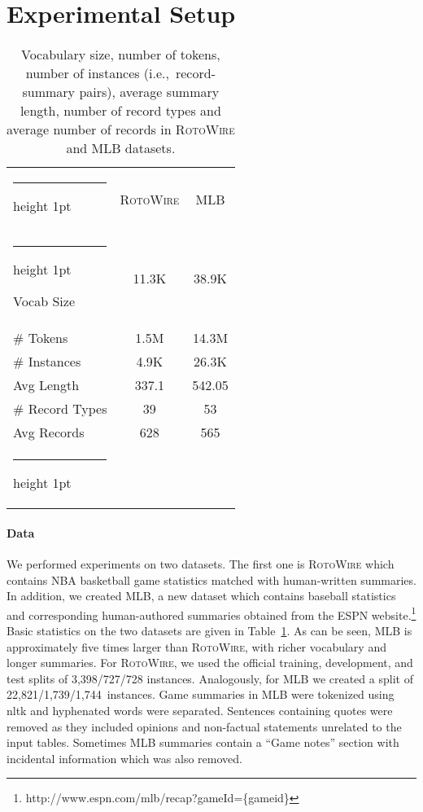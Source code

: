 \documentclass[11pt,a4paper]{article}
\makeatletter
\newcommand{\thickhline}{\noalign {\ifnum 0=`}\fi \hrule height 1pt
    \futurelet \reserved@a \@xhline
}
\makeatother
\begin{document}
\section{Experimental Setup}
\label{sec:experimental-setup}


\begin{table}[t]
\small
\begin{center}
\begin{tabular}{lcc} \thickhline 
  & \textsc{RotoWire} & MLB \\ 
\thickhline 
Vocab Size & 11.3K & 38.9K \\ 
\# Tokens & 1.5M & 14.3M \\ 
\# Instances & 4.9K & 26.3K \\ 
Avg  Length & 337.1 & 542.05 \\ 
\# Record Types & 39 & 53 \\ 
Avg Records & 628 & 565 \\ \thickhline 
\end{tabular} 
\end{center}
\caption{Vocabulary size, number of tokens,  number of instances
  (i.e.,~record-summary pairs), average
  summary length, number of record types and average number of records in
  \textsc{RotoWire} and MLB datasets.}
\label{dataset-stats}
\end{table}

\paragraph{Data}
We performed experiments on two datasets. The first one is
\textsc{RotoWire} \cite{D17-1239} which contains NBA basketball game
statistics matched with human-written summaries. In addition, we
created MLB, a new dataset which contains baseball statistics and
corresponding human-authored summaries obtained from the ESPN
website.\footnote{http://www.espn.com/mlb/recap?gameId=\{gameid\}}
Basic statistics on the two datasets are given in
Table~\ref{dataset-stats}. As can be seen, MLB is approximately five
times larger than \textsc{RotoWire}, with richer vocabulary and longer
summaries. For \textsc{RotoWire}, we used the official training,
development, and test splits of 3,398/727/728 instances.  Analogously,
for MLB we created a split of 22,821/1,739/1,744~instances. Game
summaries in MLB were tokenized using nltk and hyphenated words were
separated. Sentences containing quotes were removed as they included
opinions and non-factual statements unrelated to the input
tables. Sometimes MLB summaries contain a ``Game notes'' section with
incidental information which was also removed.
\end{document}
